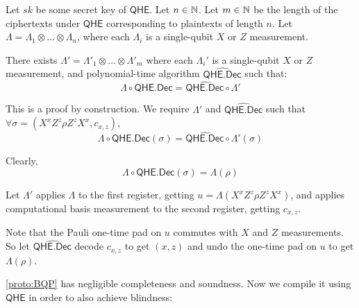 \begin{thm}
	\label{decodeMeasureOrder}
	Let $sk$ be some secret key of $\mathsf{QHE}$.
	Let $n\in\mathbb{N}$.
	Let $m\in\mathbb{N}$ be the length of the ciphertexts under $\mathsf{QHE}$ corresponding to plaintexts of length $n$.
	Let $\Lambda=\Lambda_1\otimes\ldots\otimes\Lambda_n$, where each $\Lambda_i$ is a single-qubit $X$ or $Z$ measurement.

	There exists $\Lambda'=\Lambda'_1\otimes\ldots\otimes\Lambda'_m$ where each $\Lambda_i'$ is a single-qubit $X$ or $Z$ measurement, and polynomial-time algorithm $\widehat{\mathsf{QHE.Dec}}$ such that:
	$$\Lambda\circ\mathsf{QHE.Dec}=\widehat{\mathsf{QHE.Dec}}\circ\Lambda'$$
\end{thm}
\begin{prf}
	This is a proof by construction.
	We require $\Lambda'$ and $\widehat{\mathsf{QHE.Dec}}$ such that $\forall\sigma=(X^xZ^z\rho Z^zX^x, c_{x,z})$,
	$$\Lambda\circ\mathsf{QHE.Dec}(\sigma)=\widehat{\mathsf{QHE.Dec}}\circ\Lambda'(\sigma)$$

	Clearly,
	$$\Lambda\circ\mathsf{QHE.Dec}(\sigma)=\Lambda(\rho)$$
	
	Let $\Lambda'$ applies $\Lambda$ to the first register, getting $u=\Lambda(X^xZ^z\rho Z^zX^x)$, and applies computational basis measurement to the second register, getting $c_{x, z}$.

	Note that the Pauli one-time pad on $u$ commutes with $X$ and $Z$ measurements.
	So let $\widehat{\mathsf{QHE.Dec}}$ decode $c_{x, z}$ to get $(x, z)$ and undo the one-time pad on $u$ to get $\Lambda(\rho)$.
\end{prf}

\cref{proto:BQP} has negligible completeness and soundness.
Now we compile it using $\mathsf{QHE}$ in order to also achieve blindness:

